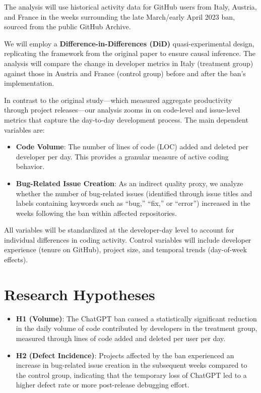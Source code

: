 The analysis will use historical activity data for GitHub users from Italy, Austria, and France in the weeks surrounding the late March/early April 2023 ban, sourced from the public GitHub Archive.

We will employ a \textbf{Difference-in-Differences (DiD)} quasi-experimental design, replicating the framework from the original paper to ensure causal inference. The analysis will compare the change in developer metrics in Italy (treatment group) against those in Austria and France (control group) before and after the ban's implementation.

In contrast to the original study—which measured aggregate productivity through project releases—our analysis zooms in on code-level and issue-level metrics that capture the day-to-day development process. The main dependent variables are:

\begin{itemize}
  \item \textbf{Code Volume}: The number of lines of code (LOC) added and deleted per developer per day. This provides a granular measure of active coding behavior.
  \item \textbf{Bug-Related Issue Creation}: As an indirect quality proxy, we analyze whether the number of bug-related issues (identified through issue titles and labels containing keywords such as “bug,” “fix,” or “error”) increased in the weeks following the ban within affected repositories.
\end{itemize}

All variables will be standardized at the developer-day level to account for individual differences in coding activity. Control variables will include developer experience (tenure on GitHub), project size, and temporal trends (day-of-week effects).


\section*{Research Hypotheses}

\begin{itemize}
  \item \textbf{H1 (Volume)}: The ChatGPT ban caused a statistically significant reduction in the daily volume of code contributed by developers in the treatment group, measured through lines of code added and deleted per user per day.
  \item \textbf{H2 (Defect Incidence)}: Projects affected by the ban experienced an increase in bug-related issue creation in the subsequent weeks compared to the control group, indicating that the temporary loss of ChatGPT led to a higher defect rate or more post-release debugging effort.
\end{itemize}


